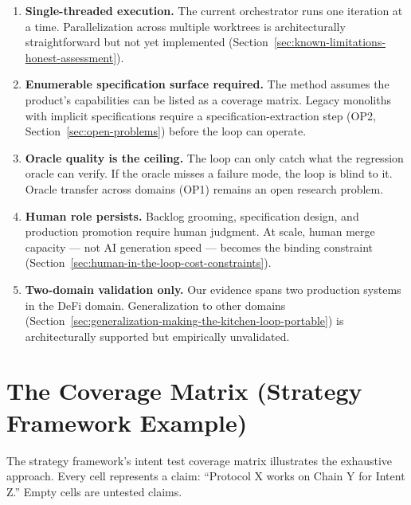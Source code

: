 \documentclass[11pt,a4paper]{article}
\begin{document}
\begin{enumerate}[nosep]
\item \textbf{Single-threaded execution.} The current orchestrator runs one iteration at a time. Parallelization across multiple worktrees is architecturally straightforward but not yet implemented (Section~\ref{sec:known-limitations-honest-assessment}).
\item \textbf{Enumerable specification surface required.} The method assumes the product's capabilities can be listed as a coverage matrix. Legacy monoliths with implicit specifications require a specification-extraction step (OP2, Section~\ref{sec:open-problems}) before the loop can operate.
\item \textbf{Oracle quality is the ceiling.} The loop can only catch what the regression oracle can verify. If the oracle misses a failure mode, the loop is blind to it. Oracle transfer across domains (OP1) remains an open research problem.
\item \textbf{Human role persists.} Backlog grooming, specification design, and production promotion require human judgment. At scale, human merge capacity --- not AI generation speed --- becomes the binding constraint (Section~\ref{sec:human-in-the-loop-cost-constraints}).
\item \textbf{Two-domain validation only.} Our evidence spans two production systems in the DeFi domain. Generalization to other domains (Section~\ref{sec:generalization-making-the-kitchen-loop-portable}) is architecturally supported but empirically unvalidated.
\end{enumerate}


\appendix
\clearpage

\section{The Coverage Matrix (Strategy Framework Example)}\label{sec:appendix-c-the-coverage-matrix-strategy-framework-example}

The strategy framework's intent test coverage matrix illustrates the exhaustive approach. Every cell represents a claim: ``Protocol X works on Chain Y for Intent Z.'' Empty cells are untested claims.
\end{document}

